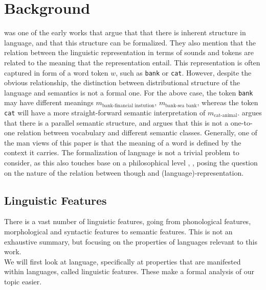 \documentclass[a4paper,12pt,twoside,openright]{report}
\begin{document}

\chapter{Background} 


\cite{harris54} was one of the early works that argue that that there is inherent structure in language, and that this structure can be formalized.
They also mention that the relation between the linguistic representation in terms of sounds and tokens are related to the meaning that the representation entail. 
This representation is often captured in form of a word token $w$, such as \Verb#bank# or \Verb#cat#.
However, despite the obvious relationship, the distinction between distributional structure of the language and semantics is not a formal one. 
For the above case, the token \Verb#bank# may have different meanings $m_\text{bank-financial instution}$, $m_\text{bank-sea bank}$, whereas the token \Verb#cat# will have a more straight-forward semantic interpretation of $m_\text{cat-animal}$.
\cite{harris54} argues that there is a parallel semantic structure, and argues that this is not a one-to-one relation between vocabulary and different semantic classes.
Generally, one of the man views of this paper is that the meaning of a word is defined by the context it carries.
The formalization of language is not a trivial problem to consider, as this also touches base on a philosophical level \cite{hegel17}, \cite{wittgenstein53}, posing the question on the nature of the relation between though and (language)-representation.

\section{Linguistic Features}

There is a vast number of linguistic features, going from phonological features, morphological and syntactic features to semantic features.
This is not an exhaustive summary, but focusing on the properties of languages relevant to this work. \\

We will first look at language, specifically at properties that are manifested within languages, called linguistic features.
These make a formal analysis of our topic easier.
\end{document}
